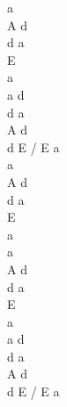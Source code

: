 \documentclass[a5paper, 10pt]{book}
\begin{document}
\begin{minipage}[t]{0.2\textwidth}
  a\\
  A d\\
  d a\\
  E\\
  a\\

  a d \\
  d a \\
  A d \\
  d E / E a\\

  a\\
  A d\\
  d a\\
  E\\
  a\\

  a\\
  A d\\
  d a\\
  E\\
  a\\

  a d \\
  d a \\
  A d \\
  d E / E a\\

\end{minipage}

\newpage
\end{document}
